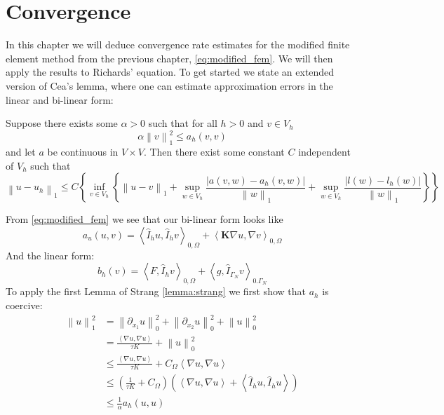 \documentclass[../Main/main.tex]{subfiles}
\begin{document}
	\graphicspath{{../Convergence/figs/}}
	\chapter{Convergence}
	In this chapter we will deduce convergence rate estimates for the modified finite element method from the previous chapter, \eqref{eq:modified_fem}. We will then apply the results to Richards' equation. To get started we state an extended version of Cea's lemma, where one can estimate approximation errors in the linear and bi-linear form:

	\begin{lemma}\label{lemma:strang}
		Suppose there exists some $\alpha>0$ such that for all $h>0$ and $v\in V_h$
		\begin{equation*}
			\alpha \left \| v \right \|^2_1 \leq a_h(v,v) 
		\end{equation*}
		and let $a$ be continuous in $V\times V$. Then there exist some constant $C$ independent of $V_h$ such that
		\begin{equation}\label{eq:strang_ineq}
			\left \| u-u_h \right \|_1 \leq C\left \{ \inf_{v \in V_h}\left \{ \left \| u-v \right \|_1 + \sup_{w\in V_h}\frac{|a(v,w)-a_h(v,w)|}{\left \| w \right \|_1}+\sup_{w\in V_h}\frac{|l(w)-l_h(w)|}{\left \| w \right \|_1} \right \} \right \}
		\end{equation}
	\end{lemma}
	From \eqref{eq:modified_fem} we see that our bi-linear form looks like
	\begin{equation}
		a_u(u,v) = \left \langle \hat{I}_h u, \hat{I}_h v \right \rangle_{0,\Omega} +  \left \langle \pmb{K} \nabla u, \nabla v \right \rangle_{0,\Omega} 
	\end{equation}
	And the linear form:
	\begin{equation}
		b_h(v)= \left \langle F,\hat{I}_h v \right \rangle_{0,\Omega} + \left \langle g,\hat{I}_{\Gamma_N} v \right \rangle_{0.\Gamma_N}
	\end{equation}
	To apply the first Lemma of Strang \ref{lemma:strang} we first show that $a_h$ is coercive:
	\begin{equation}
		\begin{aligned}
			\left \| u \right \|_1^2 &= \left \| \partial_{x_1} u \right \|_0^2 + \left \| \partial_{x_2} u \right \|_0^2 + \left \| u \right \|_0^2 \\
			&= \frac{\left \langle \nabla u,\nabla u \right \rangle}{\tau K} + \left \| u \right \|_0^2 \\
			&\leq \frac{\left \langle \nabla u,\nabla u \right \rangle}{\tau K} + C_{\Omega} \left \langle \nabla u, \nabla u \right \rangle \\
			&\leq (\frac{1}{\tau K} + C_{\Omega})(\left \langle \nabla u, \nabla u \right \rangle + \left \langle \hat{I}_h u, \hat{I}_h u \right \rangle)\\
			&\leq \frac{1}{\alpha} a_h(u,u) 
		\end{aligned}
	\end{equation} 
\end{document}

